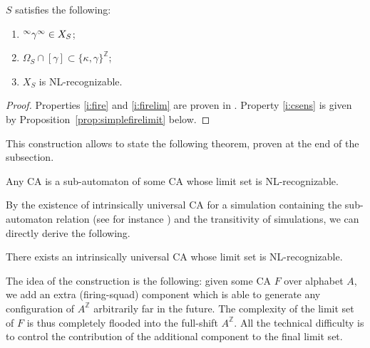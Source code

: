 \documentclass{jac}
\newcommand{\Z}{\mathbb Z}
\newcommand{\dinf}[1]{\vphantom{#1}^\infty{#1}^\infty}
\theoremstyle{definition}
\begin{document}
\begin{lem}\label{l:fsquad}
$S$ satisfies the following:
\begin{enumerate}
 \item\label{i:fire} $\dinf\gamma\in X_S$;\item\label{i:firelim} $\Omega_S\cap[\gamma]\subset\{\kappa,\gamma\}^\Z$;
 \item\label{i:csens} $X_S$ is NL-recognizable.
\end{enumerate} 
\begin{proof}
  Properties \eqref{i:fire} and \eqref{i:firelim} are proven in \cite{rice}. Property \eqref{i:csens} is given by Proposition~\ref{prop:simplefirelimit} below. \end{proof}
\end{lem}

This construction allows to state the following theorem, proven at the end of the subsection.
\begin{thm}\label{t:simple}
  Any CA is a sub-automaton of some CA whose limit set is NL-recognizable. \end{thm}

By the existence of intrinsically universal CA for a simulation containing the sub-automaton relation (see for instance \cite{univind}) and the transitivity of simulations, we can directly derive the following.
\begin{cor}\label{c:univ}
  There exists an intrinsically universal CA whose limit set is
  NL-recognizable. \end{cor}

The idea of the construction is the following: given some CA $F$ over alphabet $A$, we add an extra (firing-squad) component which is able to generate any configuration of $A^\Z$ arbitrarily far in the future. The complexity of the limit set of $F$ is thus completely flooded into the full-shift $A^\Z$. All the technical difficulty is to control the contribution of the additional component to the final limit set. 
\end{document}
